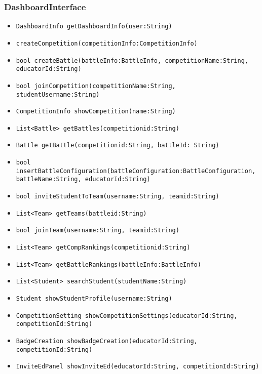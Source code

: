 \subsubsection{DashboardInterface}
\begin{itemize}
    \item \texttt{DashboardInfo getDashboardInfo(user:String)}%
    \item \texttt{createCompetition(competitionInfo:CompetitionInfo)}%
    \item \texttt{bool createBattle(battleInfo:BattleInfo, competitionName:String,\\educatorId:String)}%
    \item \texttt{bool joinCompetition(competitionName:String, studentUsername:String)}%
    \item \texttt{CompetitionInfo showCompetition(name:String)}%
    \item \texttt{List<Battle> getBattles(competitionid:String)}%
    \item \texttt{Battle getBattle(competitionid:String, battleId: String)}
    \item \texttt{bool insertBattleConfiguration(battleConfiguration:BattleConfiguration, battleName:String, educatorId:String)}%
    \item \texttt{bool inviteStudentToTeam(username:String, teamid:String)}%
    \item \texttt{List<Team> getTeams(battleid:String)}%
    \item \texttt{bool joinTeam(username:String, teamid:String)}%
    \item \texttt{List<Team> getCompRankings(competitionid:String)}
    \item \texttt{List<Team> getBattleRankings(battleInfo:BattleInfo)}
    \item \texttt{List<Student> searchStudent(studentName:String)}%
    \item \texttt{Student showStudentProfile(username:String)}%
    \item \texttt{CompetitionSetting showCompetitionSettings(educatorId:String,\\competitionId:String)}%
    \item \texttt{BadgeCreation showBadgeCreation(educatorId:String, competitionId:String)}%
    \item \texttt{InviteEdPanel showInviteEd(educatorId:String, competitionId:String)}%

\end{itemize}
